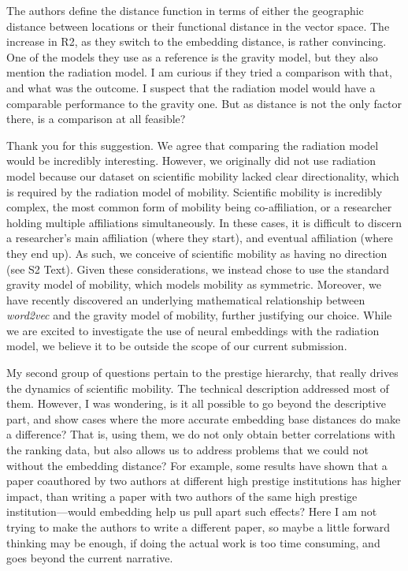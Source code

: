 \documentclass[12pt,a4paper]{article}
\newcommand{\response}[1]{{\noindent #1}}
\newcommand{\rcomment}[1]{%
\vspace{10pt}
\begin{tcolorbox}[colback=black!3,colframe=white!45!black, left=0pt, right=0pt, top=0pt, bottom=0pt, arc=0pt,outer arc=0pt, grow to left by=-0.5cm,grow to right by=-0.5cm]
#1
\end{tcolorbox}
}
\begin{document}
\rcomment{
The authors define the distance function in terms of either the geographic distance between locations or their functional distance in the vector space. The increase in R2, as they switch to the embedding distance, is rather convincing. One of the models they use as a reference is the gravity model, but they also mention the radiation model. I am curious if they tried a comparison with that, and what was the outcome. I suspect that the radiation model would have a comparable performance to the gravity one. But as distance is not the only factor there, is a comparison at all feasible?
}

\response{Thank you for this suggestion. 
We agree that comparing the radiation model would be incredibly interesting.
However, we originally did not use radiation model because our dataset on scientific mobility lacked clear directionality, which is required by the radiation model of mobility. 
Scientific mobility is incredibly complex, the most common form of mobility being co-affiliation, or a researcher holding multiple affiliations simultaneously. 
In these cases, it is difficult to discern a researcher's main affiliation (where they start), and eventual affiliation (where they end up).
As such, we conceive of scientific mobility as having no direction (see S2 Text). 
Given these considerations, we instead chose to use the standard gravity model of mobility, which models mobility as symmetric.
Moreover, we have recently discovered an underlying mathematical relationship between \textit{word2vec} and the gravity model of mobility, further justifying our choice. 
While we are excited to investigate the use of neural embeddings with the radiation model, we believe it to be outside the scope of our current submission. 
}

\rcomment{
  My second group of questions pertain to the prestige hierarchy, that really drives the dynamics of scientific mobility. The technical description addressed most of them. However, I was wondering, is it all possible to go beyond the descriptive part, and show cases where the more accurate embedding base distances do make a difference? That is, using them, we do not only obtain better correlations with the ranking data, but also allows us to address problems that we could not without the embedding distance? For example, some results have shown that a paper coauthored by two authors at different high prestige institutions has higher impact, than writing a paper with two authors of the same high prestige institution—would embedding help us pull apart such effects? Here I am not trying to make the authors to write a different paper, so maybe a little forward thinking may be enough, if doing the actual work is too time consuming, and goes beyond the current narrative.
}
\end{document}

